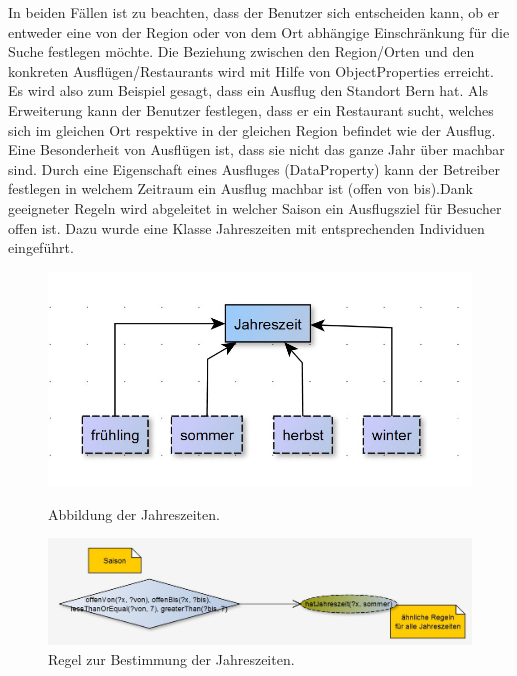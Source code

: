 In beiden Fällen ist zu beachten, dass der Benutzer sich entscheiden kann, ob er entweder eine von der Region oder von dem Ort abhängige Einschränkung für die Suche festlegen möchte. Die Beziehung zwischen den Region/Orten und den konkreten Ausflügen/Restaurants wird mit Hilfe von ObjectProperties erreicht. Es wird also zum Beispiel gesagt, dass ein Ausflug den Standort Bern hat. Als Erweiterung kann der Benutzer festlegen, dass er ein Restaurant sucht, welches sich im gleichen Ort respektive in der gleichen Region befindet wie der Ausflug.\\

Eine Besonderheit von Ausflügen ist, dass sie nicht das ganze Jahr über machbar sind. Durch eine Eigenschaft eines Ausfluges (DataProperty) kann der Betreiber festlegen in welchem Zeitraum ein Ausflug machbar ist (offen von bis).Dank geeigneter Regeln wird abgeleitet in welcher Saison ein Ausflugsziel für Besucher offen ist. Dazu wurde eine Klasse Jahreszeiten mit entsprechenden Individuen eingeführt.\\
    \begin{figure}[H]%
        \begin{minipage}[hbt]{0,49\textwidth}
            \centering
            \includegraphics[scale=0.3]{bilder/SaisonKlasse.jpg}
            \caption*{Abbildung der Jahreszeiten.\label{fig:SaisonKlasse}\protect\footnotemark}
        \end{minipage}
        \begin{minipage}[hbt]{0,49\textwidth}
            \centering
            \includegraphics[scale=0.3]{bilder/SaisonRegeln.jpg}
            \caption*{Regel zur Bestimmung der Jahreszeiten.\label{fig:SaisonRegeln}\protect\footnotemark[2]}
        \end{minipage}
    \end{figure}


